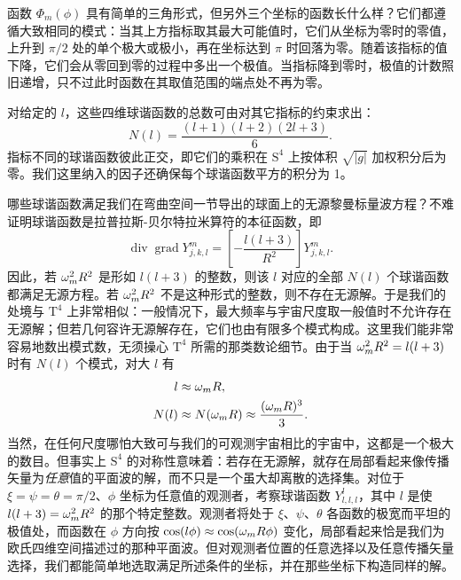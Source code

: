 
函数 $\Phi_{m}(\phi)$ 具有简单的三角形式，但另外三个坐标的函数长什么样？它们都遵循大致相同的模式：当其上方指标取其最大可能值时，它们从坐标为零时的零值，上升到 $\pi/2$ 处的单个极大或极小，再在坐标达到 $\pi$ 时回落为零。随着该指标的值下降，它们会从零回到零的过程中多出一个极值。当指标降到零时，极值的计数照旧递增，只不过此时函数在其取值范围的端点处不再为零。

对给定的 $l$，这些四维球谐函数的总数可由对其它指标的约束求出：
\begin{equation}
N(l) = \frac{(l+1)(l+2)(2l+3)}{6}.
\end{equation}
指标不同的球谐函数彼此正交，即它们的乘积在 $\text{S}^{4}$ 上按体积 $\sqrt{|g|}$ 加权积分后为零。我们这里纳入的因子还确保每个球谐函数平方的积分为 1。

哪些球谐函数满足我们在弯曲空间一节导出的球面上的无源黎曼标量波方程？不难证明球谐函数是拉普拉斯-贝尔特拉米算符的本征函数，即
\begin{equation}
\operatorname{div}\operatorname{grad} Y^{m}_{j,k,l} = \left[-\frac{l(l+3)}{R^{2}}\right] Y^{m}_{j,k,l}.
\end{equation}
因此，若 $\omega_m^{2}R^{2}$ 是形如 $l(l+3)$ 的整数，则该 $l$ 对应的全部 $N(l)$ 个球谐函数都满足无源方程。若 $\omega_m^{2}R^{2}$ 不是这种形式的整数，则不存在无源解。于是我们的处境与 $\text{T}^{4}$ 上非常相似：一般情况下，最大频率与宇宙尺度取一般值时不允许存在无源解；但若几何容许无源解存在，它们也由有限多个模式构成。这里我们能非常容易地数出模式数，无须操心 $\text{T}^{4}$ 所需的那类数论细节。由于当 $\omega_m^{2}R^{2}=l(l+3)$ 时有 $N(l)$ 个模式，对大 $l$ 有
\begin{align}
l &\approx \omega_m R,\\
N(l) &\approx N(\omega_m R) \approx \frac{(\omega_m R)^{3}}{3}.
\end{align}
当然，在任何尺度哪怕大致可与我们的可观测宇宙相比的宇宙中，这都是一个极大的数目。但事实上 $\text{S}^{4}$ 的对称性意味着：若存在无源解，就存在局部看起来像传播矢量为\emph{任意}值的平面波的解，而不只是一个虽大却离散的选择集。对位于 $\xi=\psi=\theta=\pi/2$、$\phi$ 坐标为任意值的观测者，考察球谐函数 $Y^{l}_{l,l,l}$，其中 $l$ 是使 $l(l+3)=\omega_m^{2}R^{2}$ 的那个特定整数。观测者将处于 $\xi$、$\psi$、$\theta$ 各函数的极宽而平坦的极值处，而函数在 $\phi$ 方向按 $\cos(l\phi)\approx\cos(\omega_m R\phi)$ 变化，局部看起来恰是我们为欧氏四维空间描述过的那种平面波。但对观测者位置的任意选择以及任意传播矢量选择，我们都能简单地选取满足所述条件的坐标，并在那些坐标下构造同样的解。

